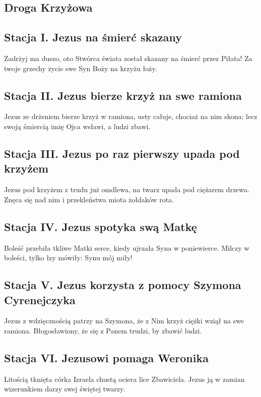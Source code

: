 \documentclass[wide,landscape,a4paper,12pt]{mwart}
\begin{document}
\setlength{\columnseprule}{0.1pt}

\pagestyle{empty}
\begin{multicols}{2}
	
\section{Droga Krzyżowa}

\subsection{Stacja I. Jezus na śmierć skazany}
Zadrżyj ma duszo, oto Stwórca świata został skazany na śmierć przez Piłata! Za twoje grzechy życie swe Syn Boży na krzyżu łoży.

\subsection{Stacja II. Jezus bierze krzyż na swe ramiona}
Jezus ze drżeniem bierze krzyż w ramiona, usty całuje, chociaż na nim skona;
lecz swoją śmiercią imię Ojca wsławi, a ludzi zbawi.

\subsection{Stacja III. Jezus po raz pierwszy upada pod krzyżem }
Jezus pod krzyżem z trudu już omdlewa, na twarz upada pod ciężarem drzewa.
Znęca się nad nim i przekleństwa miota żołdaków rota.

\subsection{Stacja IV. Jezus spotyka swą Matkę}
Boleść przebiła tkliwe Matki serce, kiedy ujrzała Syna w poniewierce.
Milczy w boleści, tylko łzy mówiły: Synu mój miły!

\subsection{Stacja V. Jezus korzysta z pomocy Szymona Cyrenejczyka}
Jezus z wdzięcznością patrzy na Szymona, że z Nim krzyż ciężki wziął na swe ramiona.
Błogosławiony, że się z Panem trudzi, by zbawić ludzi.

\subsection{Stacja VI. Jezusowi pomaga Weronika}
Litością tknięta córka Izraela chustą ociera lice Zbawiciela.
Jezus ją w zamian wizerunkiem darzy swej świętej twarzy.


\end{multicols}
\end{document}

